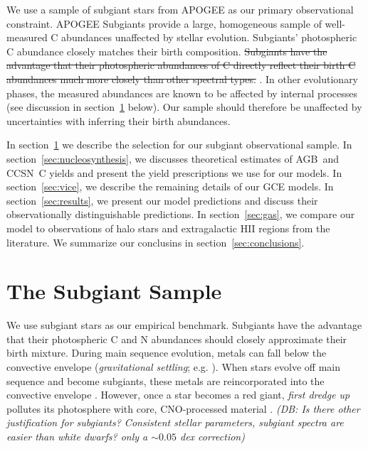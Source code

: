 \documentclass[fleqn,
referee, %
usenatbib]{mnras}
\newcommand{\agb}{AGB}
\newcommand{\cc}{CCSN}
\newcommand{\Zo}{ Z_{\sun}}
\newcommand{\strike}[1]{{\color{ForestGreen} \sout{#1}}}
\newcommand{\dbstrike}[1]{{\color{Thistle} \sout{#1} }}
\newcommand{\dbadd}[1]{{\color{Thistle} #1}}
\newcommand{\dbnote}[1]{ {\color{Thistle} \textit{\small (DB: #1)}} }
\begin{document}
We use a sample of subgiant stars from APOGEE \citep{apogee17} as our primary observational constraint.
APOGEE Subgiants provide a large, homogeneous sample of well-measured C abundances unaffected by stellar evolution.
\dbadd{Subgiants' photospheric C abundance closely matches their birth composition.}
\dbstrike{Subgiants have the advantage that their photospheric abundances of C directly reflect their birth C abundances much more closely than other spectral types.} \citep{gilroy89, korn+07, lind+08, souto+18, souto19}.
In other evolutionary phases, the measured abundances are known to be affected by internal processes (see discussion in section~\ref{sec:data_selection} below).
Our sample should therefore be unaffected by uncertainties with inferring their birth abundances.



In section~\ref{sec:data_selection} we describe the selection for our subgiant observational sample.
In section~\ref{sec:nucleosynthesis}, we discusses theoretical estimates of \agb\ and \cc\ C yields and present the yield prescriptions we use for our models.
In section~\ref{sec:vice}, we describe the remaining details of our GCE models.
In section~\ref{sec:results}, we present our model predictions and discuss their observationally distinguishable predictions. 
In section~\ref{sec:gas}, we compare our model to observations of halo stars and extragalactic HII regions from the literature. 
We summarize our conclusins in section~\ref{sec:conclusions}.







\section{The Subgiant Sample}\label{sec:data_selection}




We use subgiant stars as our empirical benchmark.
Subgiants have the advantage that their photospheric C and N abundances should closely approximate their birth mixture.
During main sequence evolution, metals can fall below the convective envelope (\textit{gravitational settling}; e.g. \citealt{turncotte+98}).
When stars evolve off main sequence and become subgiants, these metals are reincorporated into the convective envelope \citep[]{gratton+00, souto19}. 
However, once a star becomes a red giant, \textit{first dredge up} pollutes its photosphere with core, CNO-processed material
\citep{iben67, KL14}. 
\dbnote{Is there other justification for subgiants? Consistent stellar parameters, subgiant spectra are easier than white dwarfs? only a $\sim 0.05$ dex correction}
\end{document}
